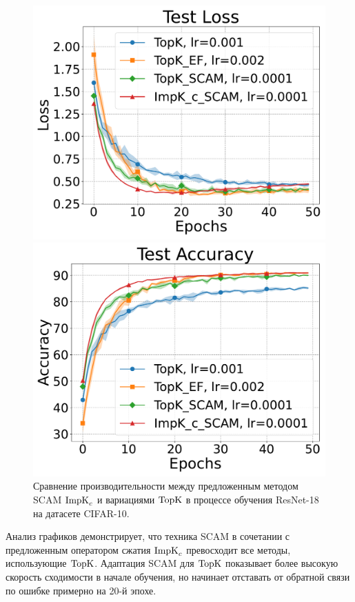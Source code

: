 \begin{figure}[ht]
\begin{minipage}{0.45\textwidth}
        \end{minipage}
        \begin{minipage}{0.45\textwidth}
            \includegraphics[width=\textwidth]{figures/resnet/experiment2/Test Loss.pdf}
        \end{minipage}
        \begin{minipage}{0.45\textwidth}
            \includegraphics[width=\textwidth]{figures/resnet/experiment2/Test Accuracy.pdf}
        \end{minipage}
        \caption{Сравнение производительности между предложенным методом SCAM $\operatorname{ImpK}_c$ и вариациями $\operatorname{TopK}$ в процессе обучения ResNet-18 на датасете CIFAR-10.}
    \end{figure}
    Анализ графиков демонстрирует, что техника SCAM в сочетании с предложенным оператором сжатия $\operatorname{ImpK}_c$ превосходит все методы, использующие $\operatorname{TopK}$. Адаптация SCAM для $\operatorname{TopK}$ показывает более высокую скорость сходимости в начале обучения, но начинает отставать от обратной связи по ошибке примерно на 20-й эпохе.

